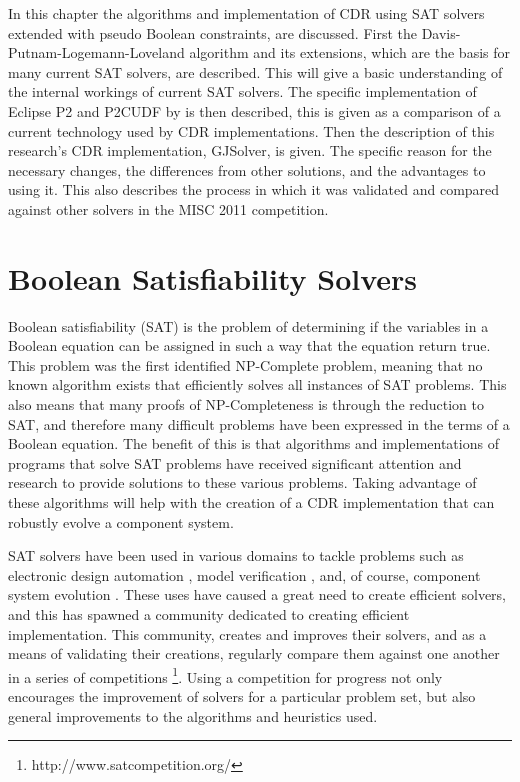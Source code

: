 In this chapter the algorithms and implementation of CDR using SAT solvers extended with pseudo Boolean constraints, are discussed.
First the Davis-Putnam-Logemann-Loveland algorithm \citep{Davis1960, davis1962machine} and its extensions, which are the basis for many current SAT solvers, are described.
This will give a basic understanding of the internal workings of current SAT solvers.
The specific implementation of Eclipse P2 and P2CUDF by \cite{leBerre2010} is then described,
this is given as a comparison of a current technology used by CDR implementations.
Then the description of this research's CDR implementation, GJSolver, is given.
The specific reason for the necessary changes, the differences from other solutions, and the advantages to using it.
This also describes the process in which it was validated and compared against other solvers in the MISC 2011 competition.

\section{Boolean Satisfiability Solvers}
\label{impl.SAT}
Boolean satisfiability (SAT) is the problem of determining if the variables in a Boolean equation can be assigned in such a way that the equation return true.
This problem was the first identified NP-Complete problem, meaning that no known algorithm exists that efficiently solves all instances of SAT problems.
This also means that many proofs of NP-Completeness is through the reduction to SAT, and therefore many difficult problems have been expressed in the terms of a Boolean equation.
The benefit of this is that algorithms and implementations of programs that solve SAT problems have received significant attention and research to provide solutions to these various problems.
Taking advantage of these algorithms will help with the creation of a CDR implementation that can robustly evolve a component system.

SAT solvers have been used in various domains to tackle problems such as electronic design automation \citep{Marques-Silva2000}, 
model verification \citep{dennis2006}, and, of course, component system evolution \citep{leBerre2010}.
These uses have caused a great need to create efficient solvers, and this has spawned a community dedicated to creating efficient implementation.
This community, creates and improves their solvers, 
and as a means of validating their creations, regularly compare them against one another in a series of competitions \footnote{http://www.satcompetition.org/}.
Using a competition for progress not only encourages the improvement of solvers for a particular problem set, but also general improvements to the algorithms and heuristics used. 

